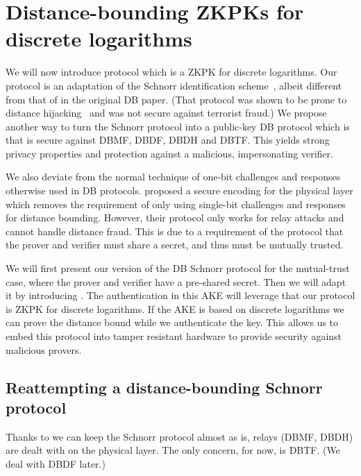 \section{Distance-bounding \aclp*{ZKPK} for discrete logarithms}%
\label{DB-anon-cred}

We will now introduce  protocol which is a \ac{ZKPK} for discrete 
logarithms.
Our protocol is an adaptation of the Schnorr identification 
scheme~\cite{Schnorr}, albeit different from that of 
\textcite{DistanceBounding} in the original \ac{DB} paper.
(That protocol was shown to be prone to distance 
hijacking~\cite{DistanceHijacking,TamarinDB} and was not secure against 
terrorist fraud.)
We propose another way to turn the Schnorr protocol into a public-key \ac{DB} 
protocol which is  that is secure against \ac{DBMF}, \ac{DBDF}, 
\ac{DBDH} and \ac{DBTF}.
This yields strong privacy properties and protection against a malicious, 
impersonating verifier.

We also deviate from the normal technique of one-bit challenges and responses 
otherwise used in \ac{DB} protocols.
\Textcite{UWBPR} proposed a secure encoding for the physical 
layer which removes the requirement of only using single-bit challenges and 
responses for distance bounding.
However, their protocol only works for relay attacks and cannot handle distance 
fraud.
This is due to a requirement of the protocol that the prover and verifier must 
share a secret, and thus must be mutually trusted.

We will first present our version of the \ac{DB} Schnorr protocol for the 
mutual-trust case, where the prover and verifier have a pre-shared secret.
Then we will adapt it by introducing .
The authentication in this \ac{AKE} will leverage that our protocol is  
\ac{ZKPK} for discrete logarithms.
If the \ac{AKE} is based on discrete logarithms we can prove the distance bound 
while we authenticate the key.
This allows us to embed this protocol into tamper resistant hardware to provide 
security against malicious provers.


\subsection{Reattempting a distance-bounding Schnorr protocol}%
\label{DBSchnorr}

Thanks to \textcite{UWBPR} we can keep the Schnorr protocol 
almost as is, relays (\ac{DBMF}, \ac{DBDH}) are dealt with on the physical 
layer.
The only concern, for now, is \acl{DBTF}.
(We deal with \acl{DBDF} later.)

